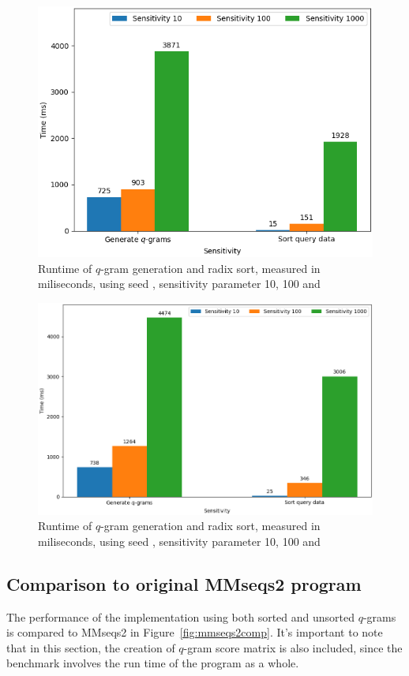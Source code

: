 \documentclass[twoside,a4paper,bsc]{master}
\newcommand{\Qgram}[1]{\(#1\)-gram}
\begin{document}
\begin{figure}
\centering
\includegraphics[scale=0.6]{graphics/hotspot_w6.png}
\caption{Runtime of \Qgram{q} generation and radix sort, measured in
miliseconds,
using seed , sensitivity parameter 10, 100 and }
\label{fig:hotspot_w6}
\end{figure}
\begin{figure}
\centering
\includegraphics[scale=0.6]{graphics/hotspot_w7.png}
\caption{Runtime of \Qgram{q} generation and radix sort, measured in
miliseconds,
using seed , sensitivity parameter 10, 100 and }
\label{fig:hotspot_w7}
\end{figure}

\subsection{Comparison to original MMseqs2 program}
The performance of the implementation using both sorted and unsorted
\Qgram{q}s
is compared to MMseqs2 in Figure~\ref{fig:mmseqs2comp}. It's important to note 
that in this section, the creation of \Qgram{q} score matrix is also included,
since the benchmark involves the run time of the program as a whole.
\end{document}
